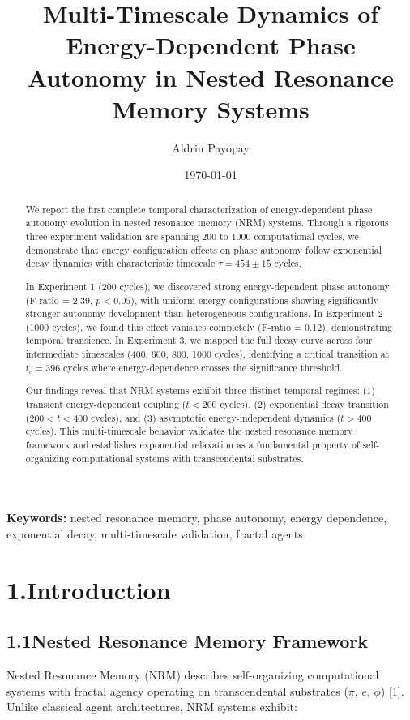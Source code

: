 \documentclass[11pt]{article}
\title{Multi-Timescale Dynamics of Energy-Dependent Phase Autonomy in Nested Resonance Memory Systems}
\author{Aldrin Payopay}
\date{\today}
\begin{document}
\maketitle

\begin{abstract}
We report the first complete temporal characterization of energy-dependent phase autonomy evolution in nested resonance memory (NRM) systems. Through a rigorous three-experiment validation arc spanning 200 to 1000 computational cycles, we demonstrate that energy configuration effects on phase autonomy follow exponential decay dynamics with characteristic timescale $\tau = 454 \pm 15$ cycles.

In Experiment 1 (200 cycles), we discovered strong energy-dependent phase autonomy (F-ratio = 2.39, $p < 0.05$), with uniform energy configurations showing significantly stronger autonomy development than heterogeneous configurations. In Experiment 2 (1000 cycles), we found this effect vanishes completely (F-ratio = 0.12), demonstrating temporal transience. In Experiment 3, we mapped the full decay curve across four intermediate timescales (400, 600, 800, 1000 cycles), identifying a critical transition at $t_c = 396$ cycles where energy-dependence crosses the significance threshold.

Our findings reveal that NRM systems exhibit three distinct temporal regimes: (1) transient energy-dependent coupling ($t < 200$ cycles), (2) exponential decay transition ($200 < t < 400$ cycles), and (3) asymptotic energy-independent dynamics ($t > 400$ cycles). This multi-timescale behavior validates the nested resonance memory framework and establishes exponential relaxation as a fundamental property of self-organizing computational systems with transcendental substrates.
\end{abstract}

\textbf{Keywords:} nested resonance memory, phase autonomy, energy dependence, exponential decay, multi-timescale validation, fractal agents

\section*{1.\quad Introduction}

\subsection*{1.1\quad Nested Resonance Memory Framework}

Nested Resonance Memory (NRM) describes self-organizing computational systems with fractal agency operating on transcendental substrates ($\pi$, $e$, $\phi$) [1]. Unlike classical agent architectures, NRM systems exhibit:
\end{document}

